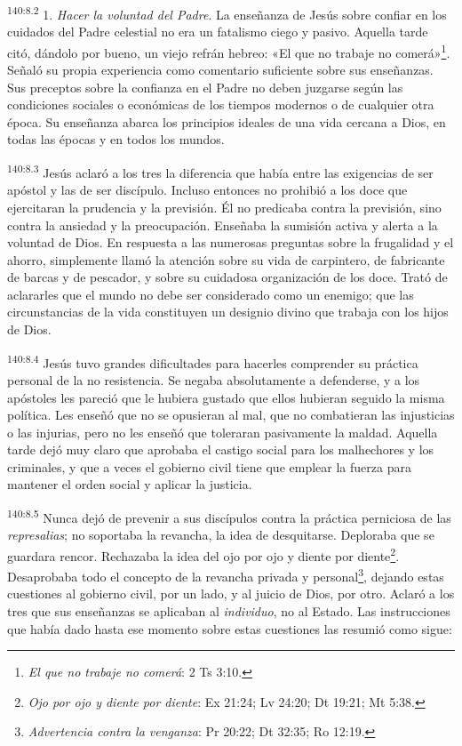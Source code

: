 \par
\textsuperscript{140:8.2} 1. \textit{Hacer la voluntad del Padre}. La enseñanza de Jesús sobre confiar en los cuidados del Padre celestial no era un fatalismo ciego y pasivo. Aquella tarde citó, dándolo por bueno, un viejo refrán hebreo: «El que no trabaje no comerá»\footnote{\textit{El que no trabaje no comerá}: 2 Ts 3:10.}. Señaló su propia experiencia como comentario suficiente sobre sus enseñanzas. Sus preceptos sobre la confianza en el Padre no deben juzgarse según las condiciones sociales o económicas de los tiempos modernos o de cualquier otra época. Su enseñanza abarca los principios ideales de una vida cercana a Dios, en todas las épocas y en todos los mundos.

\par
\textsuperscript{140:8.3} Jesús aclaró a los tres la diferencia que había entre las exigencias de ser apóstol y las de ser discípulo. Incluso entonces no prohibió a los doce que ejercitaran la prudencia y la previsión. Él no predicaba contra la previsión, sino contra la ansiedad y la preocupación. Enseñaba la sumisión activa y alerta a la voluntad de Dios. En respuesta a las numerosas preguntas sobre la frugalidad y el ahorro, simplemente llamó la atención sobre su vida de carpintero, de fabricante de barcas y de pescador, y sobre su cuidadosa organización de los doce. Trató de aclararles que el mundo no debe ser considerado como un enemigo; que las circunstancias de la vida constituyen un designio divino que trabaja con los hijos de Dios.

\par
\textsuperscript{140:8.4} Jesús tuvo grandes dificultades para hacerles comprender su práctica personal de la no resistencia. Se negaba absolutamente a defenderse, y a los apóstoles les pareció que le hubiera gustado que ellos hubieran seguido la misma política. Les enseñó que no se opusieran al mal, que no combatieran las injusticias o las injurias, pero no les enseñó que toleraran pasivamente la maldad. Aquella tarde dejó muy claro que aprobaba el castigo social para los malhechores y los criminales, y que a veces el gobierno civil tiene que emplear la fuerza para mantener el orden social y aplicar la justicia.

\par
\textsuperscript{140:8.5} Nunca dejó de prevenir a sus discípulos contra la práctica perniciosa de las \textit{represalias}; no soportaba la revancha, la idea de desquitarse. Deploraba que se guardara rencor. Rechazaba la idea del ojo por ojo y diente por diente\footnote{\textit{Ojo por ojo y diente por diente}: Ex 21:24; Lv 24:20; Dt 19:21; Mt 5:38.}. Desaprobaba todo el concepto de la revancha privada y personal\footnote{\textit{Advertencia contra la venganza}: Pr 20:22; Dt 32:35; Ro 12:19.}, dejando estas cuestiones al gobierno civil, por un lado, y al juicio de Dios, por otro. Aclaró a los tres que sus enseñanzas se aplicaban al \textit{individuo}, no al Estado. Las instrucciones que había dado hasta ese momento sobre estas cuestiones las resumió como sigue:

